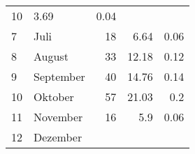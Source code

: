 \begin{longtable}{lXrrr}
       \num{10} &
       \num[round-mode=places,round-precision=2]{3.69} &
         \num[round-mode=places,round-precision=2]{0.04} \\

     7 &
     \multicolumn{1}{X}{ Juli   } &


       \num{18} &
       \num[round-mode=places,round-precision=2]{6.64} &
         \num[round-mode=places,round-precision=2]{0.06} \\

     8 &
     \multicolumn{1}{X}{ August   } &


       \num{33} &
       \num[round-mode=places,round-precision=2]{12.18} &
         \num[round-mode=places,round-precision=2]{0.12} \\

     9 &
     \multicolumn{1}{X}{ September   } &


       \num{40} &
       \num[round-mode=places,round-precision=2]{14.76} &
         \num[round-mode=places,round-precision=2]{0.14} \\

     10 &
     \multicolumn{1}{X}{ Oktober   } &


       \num{57} &
       \num[round-mode=places,round-precision=2]{21.03} &
         \num[round-mode=places,round-precision=2]{0.2} \\

     11 &
     \multicolumn{1}{X}{ November   } &


       \num{16} &
       \num[round-mode=places,round-precision=2]{5.9} &
         \num[round-mode=places,round-precision=2]{0.06} \\

     12 &
     \multicolumn{1}{X}{ Dezember   } &



\end{longtable}
